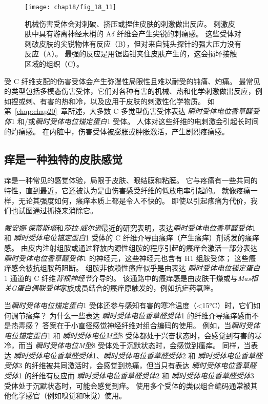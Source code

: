 \begin{figure}[htbp]
	\centering
	\texttt{[image: chap18/fig\_18\_11]}
	\caption{机械伤害受体会对刺破、挤压或捏住皮肤的刺激做出反应。
		刺激皮肤中具有游离神经末梢的 A$\delta$ 纤维会产生尖锐的刺痛感。
		这些受体对刺破皮肤的尖锐物体有反应（B），但对来自钝头探针的强大压力没有反应（A）。
		最强的反应是用锯齿钳夹住皮肤产生的，这会损坏接触区域的组织（C）\cite{perl1968myelinated}。}
	\label{fig:18_11}
\end{figure}


受 C 纤维支配的伤害受体会产生弥漫性局限性且难以耐受的钝痛、灼痛。
最常见的类型包括多模态伤害受体，它们对各种有害的机械、热和化学刺激做出反应，例如捏或刺、有害的热和冷，以及应用于皮肤的刺激性化学物质。
如第~\ref{chap:chap20}~章所述，大多数 C 多觉型伤害受体表达 \textit{瞬时受体电位香草醛受体}1 和/或\textit{瞬时受体电位锚定蛋白}1 受体。
人体对这些纤维的电刺激会引起长时间的灼痛感。
在内脏中，伤害受体被膨胀或肿胀激活，产生剧烈疼痛感。


\subsection{痒是一种独特的皮肤感觉}

痒是一种常见的感觉体验，局限于皮肤、眼结膜和粘膜。 
它与疼痛有一些共同的特性，直到最近，它还被认为是由伤害感受纤维的低放电率引起的。
就像疼痛一样，无论其强度如何，瘙痒本质上都是令人不快的。
即使以引起疼痛为代价，我们也试图通过抓挠来消除它。


\textit{戴安娜$\cdot$保蒂斯塔}和\textit{莎拉$\cdot$威尔逊}最近的研究表明，表达\textit{瞬时受体电位香草醛受体}1 和 \textit{瞬时受体电位锚定蛋白}1 受体的 C 纤维介导由瘙痒（产生瘙痒）剂诱发的瘙痒感。
由皮内注射组胺或通过释放内源性组胺的程序引起的瘙痒会激活一部分表达 \textit{瞬时受体电位香草醛受体}1 的神经元，这些神经元也含有 H1 组胺受体；
这些瘙痒感会被抗组胺药阻断。
组胺非依赖性瘙痒似乎是由表达 \textit{瞬时受体电位锚定蛋白}1 通道的 C 纤维\textit{背根神经节}介导的。
该通路中的瘙痒感是由皮肤干燥或与\textit{Mas相关G蛋白偶联受体}家族成员结合的瘙痒原触发的，例如抗疟药氯喹。


当\textit{瞬时受体电位锚定蛋白}1 受体还参与感知有害的寒冷温度（<15°C）时，它们如何调节瘙痒？
为什么一些表达 \textit{瞬时受体电位香草醛受体}1 的纤维介导瘙痒感而不是热毒感？
答案在于小直径感觉神经纤维对组合编码的使用。
例如，当\textit{瞬时受体电位锚定蛋白}1 和 \textit{瞬时受体电位M型}8 受体都处于兴奋状态时，会感觉到有害的寒冷，而当 \textit{瞬时受体电位M型}8 受体处于沉默状态时，会感觉到瘙痒。
同样，当表达 \textit{瞬时受体电位香草醛受体}1、\textit{瞬时受体电位香草醛受体}2 和 \textit{瞬时受体电位香草醛受体}3 的纤维被共同激活时，会感觉到热痛，但当只有表达 \textit{瞬时受体电位香草醛受体}1 的纤维有反应而 \textit{瞬时受体电位香草醛受体}2 和 \textit{瞬时受体电位香草醛受体}3 受体处于沉默状态时，可能会感觉到痒。
使用多个受体的类似组合编码通常被其他化学感官（例如嗅觉和味觉）使用。



